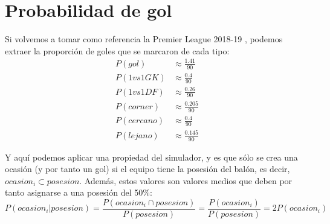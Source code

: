 \documentclass[a4paper,9pt]{article}
\begin{document}
\section{Probabilidad de gol}\label{sec:ProbGol}
\def \Pgol {\ensuremath{\frac{1.41}{90}}}
\def \PGvsGK {\ensuremath{\frac{0.4}{90}}}
\def \PGvsDF {\ensuremath{\frac{0.26}{90}}}
\def \PGcorner {\ensuremath{\frac{0.205}{90}}}
\def \PGclose {\ensuremath{\frac{0.4}{90}}}
\def \PGfar {\ensuremath{\frac{0.145}{90}}}
Si volvemos a tomar como referencia la Premier League 2018-19 \cite{PremierLeague}, podemos extraer la proporción de goles que se marcaron de cada tipo:
\begin{align}
	P(gol)&\approx\Pgol\\
	P(1vs1GK)&\approx\PGvsGK\\
	P(1vs1DF)&\approx\PGvsDF\\
	P(corner)&\approx\PGcorner\\
	P(cercano)&\approx\PGclose\\
	P(lejano)&\approx\PGfar
\end{align}

Y aquí podemos aplicar una propiedad del simulador, y es que sólo se crea una ocasión (y por tanto un gol) si el equipo tiene la posesión del balón, es decir, $ocasion_i\subset posesion$. Además, estos valores son valores medios que deben por tanto asignarse a una posesión del 50\%:
\begin{equation}\label{eq:proboccomp}
	P(ocasion_i|posesion)=\frac{P(ocasion_i\cap posesion)}{P(posesion)}=\frac{P(ocasion_i)}{P(posesion)}=2P(ocasion_i)
\end{equation}
\end{document}
